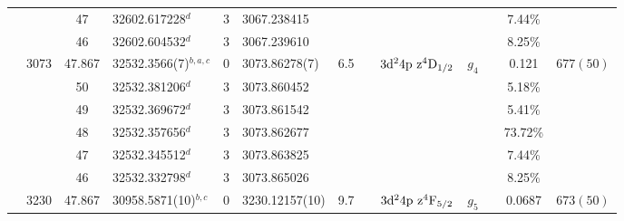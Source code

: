 \begin{table*}
\begin{center}
{\begin{tabular}{:l;l;c;l;c;l;c;l;l;c;c;c;c}
\rowstyle{\itshape}               &        & 47        & 32602.617228$^{d}$               & 3 &   3067.238415      &      & $                                        $ & $                                        $ & $      $ &              & 7.44\%    & $          $\\
\rowstyle{\itshape}               &        & 46        & 32602.604532$^{d}$               & 3 &   3067.239610      &      & $                                        $ & $                                        $ & $      $ &              & 8.25\%    & $          $\\
                                  & 3073   & 47.867    & 32532.3566(7)$^{b,a,c}$          & 0 &    3073.86278(7)   &  6.5 & $                                        $ & $3\rm{d}^24\rm{p~z}^4\rm{D}_{1/2}        $ & $g_{4} $ &              & 0.121     & $  677(50) $\\
\rowstyle{\itshape}               &        & 50        & 32532.381206$^{d}$               & 3 &   3073.860452      &      & $                                        $ & $                                        $ & $      $ &              & 5.18\%    & $          $\\
\rowstyle{\itshape}               &        & 49        & 32532.369672$^{d}$               & 3 &   3073.861542      &      & $                                        $ & $                                        $ & $      $ &              & 5.41\%    & $          $\\
\rowstyle{\itshape}               &        & 48        & 32532.357656$^{d}$               & 3 &   3073.862677      &      & $                                        $ & $                                        $ & $      $ &              & 73.72\%   & $          $\\
\rowstyle{\itshape}               &        & 47        & 32532.345512$^{d}$               & 3 &   3073.863825      &      & $                                        $ & $                                        $ & $      $ &              & 7.44\%    & $          $\\
\rowstyle{\itshape}               &        & 46        & 32532.332798$^{d}$               & 3 &   3073.865026      &      & $                                        $ & $                                        $ & $      $ &              & 8.25\%    & $          $\\
                                  & 3230   & 47.867    & 30958.5871(10)$^{b,c}$           & 0 &    3230.12157(10)  &  9.7 & $                                        $ & $3\rm{d}^24\rm{p~z}^4\rm{F}_{5/2}        $ & $g_{5} $ &              & 0.0687    & $  673(50) $\\

\end{tabular}}
\end{center}
\end{table*}
